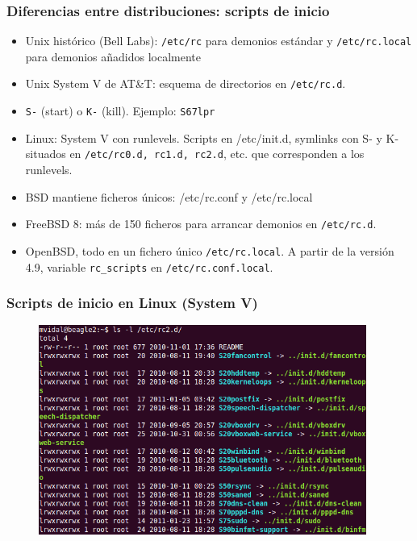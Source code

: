 \documentclass{beamer}
\begin{document}

\begin{frame}
\frametitle{Diferencias entre distribuciones: scripts de inicio}

\begin{itemize}
\item Unix histórico (Bell Labs): \texttt{/etc/rc} para demonios estándar y \texttt{/etc/rc.local} para demonios añadidos localmente
\item Unix System V de AT\&T: esquema de directorios en \texttt{/etc/rc.d}.
\item \texttt{S-} (start) o \texttt{K-} (kill). Ejemplo: \texttt{S67lpr}
\item Linux: System V con runlevels. Scripts en /etc/init.d, symlinks con S- y K- situados en \texttt{/etc/rc0.d, rc1.d, rc2.d}, etc. que corresponden a los runlevels.
\item BSD mantiene ficheros únicos: /etc/rc.conf y /etc/rc.local 
\item FreeBSD 8: más de 150 ficheros para arrancar demonios en \texttt{/etc/rc.d}.
\item OpenBSD, todo en un fichero único \texttt{/etc/rc.local}. A partir de la versión 4.9, variable \texttt{rc\_scripts} en \texttt{/etc/rc.conf.local}.
\end{itemize}

\end{frame}


\begin{frame}
\frametitle{Scripts de inicio en Linux (System V)}


\begin{figure}[h]

\begin{center}
  \includegraphics[height=2.7in]{figs/initd.png}
\end{center}
\end{figure}

\end{frame}
\end{document}
